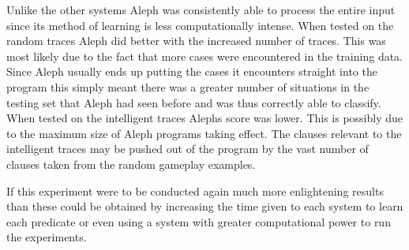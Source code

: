 Unlike the other systems Aleph was consistently able to process the entire input since its method of learning is less computationally intense. When tested on the random traces Aleph did better with the increased number of traces. This was most likely due to the fact that more cases were encountered in the training data. Since Aleph usually ends up putting the cases it encounters straight into the program this simply meant there was a greater number of situations in the testing set that Aleph had seen before and was thus correctly able to classify. When tested on the intelligent traces Alephs score was lower. This is possibly due to the maximum size of Aleph programs taking effect. The clauses relevant to the intelligent traces may be pushed out of the program by the vast number of clauses taken from the random gameplay examples.

If this experiment were to be conducted again much more enlightening results than these could be obtained by increasing the time given to each system to learn each predicate or even using a system with greater computational power to run the experiments. 


